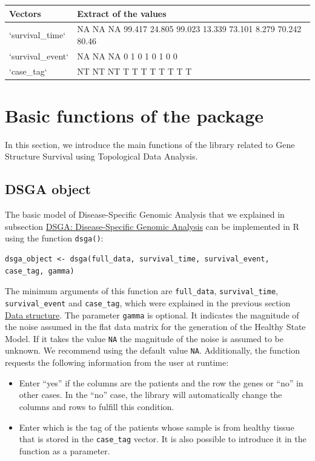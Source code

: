 \begin{tabular}{>{\raggedright\arraybackslash}p{1in}>{\raggedright\arraybackslash}p{4in}}
\toprule
Vectors & Extract of the values\\
\midrule
`survival\_time` & NA NA NA 99.417 24.805 99.023 13.339 73.101 8.279 70.242 80.46\\
`survival\_event` & NA NA NA 0 1 0 1 0 1 0 0\\
`case\_tag` & NT NT NT T T T T T T T T\\
\bottomrule
\end{tabular}

\hypertarget{section4}{%
\section{Basic functions of the package}\label{section4}}

In this section, we introduce the main functions of the library related to Gene Structure Survival using Topological Data Analysis.

\hypertarget{section4.1}{%
\subsection{DSGA object}\label{section4.1}}

The basic model of Disease-Specific Genomic Analysis that we explained in subsection \protect\hyperlink{section2.1}{DSGA: Disease-Speciﬁc Genomic Analysis} can be implemented in R using the function \texttt{dsga()}:

\begin{verbatim}
dsga_object <- dsga(full_data, survival_time, survival_event, case_tag, gamma)
\end{verbatim}

The minimum arguments of this function are \texttt{full\_data}, \texttt{survival\_time}, \texttt{survival\_event} and \texttt{case\_tag}, which were explained in the previous section \protect\hyperlink{section3}{Data structure}. The parameter \texttt{gamma} is optional. It indicates the magnitude of the noise assumed in the flat data matrix for the generation of the Healthy State Model. If it takes the value \texttt{NA} the magnitude of the noise is assumed to be unknown. We recommend using the default value \texttt{NA}. Additionally, the function requests the following information from the user at runtime:

\begin{itemize}
\tightlist
\item
  Enter ``yes'' if the columns are the patients and the row the genes or ``no'' in other cases. In the ``no'' case, the library will automatically change the columns and rows to fulfill this condition.
\item
  Enter which is the tag of the patients whose sample is from healthy tissue that is stored in the \texttt{case\_tag} vector. It is also possible to introduce it in the function as a parameter.
\end{itemize}

